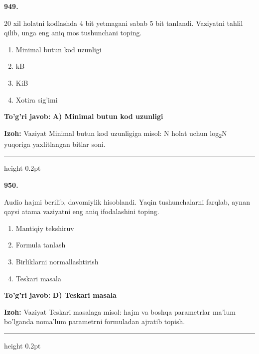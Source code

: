 \documentclass[10pt,a4paper,oneside]{article}
\begin{document}
\noindent\textbf{\color{ink}949.}
\par
20 xil holatni kodlashda 4 bit yetmagani sabab 5 bit tanlandi. Vaziyatni tahlil qilib, unga eng aniq mos tushunchani toping.
\begin{enumerate}[label=\Alph*),leftmargin=9mm]
\item Minimal butun kod uzunligi
\item kB
\item KiB
\item Xotira sig'imi
\end{enumerate}
\begin{tcolorbox}[enhanced,breakable,colback=teal!4,colframe=teal!50!black,boxrule=0.5pt,arc=1.1mm,left=3mm,right=3mm,top=1.7mm,bottom=1.7mm,before skip=2mm,after skip=2mm]
\textbf{\color{teal}To'g'ri javob:} \textbf{A) Minimal butun kod uzunligi}
\par\smallskip
\textbf{Izoh:} Vaziyat Minimal butun kod uzunligiga misol: N holat uchun log\textsubscript{2}N yuqoriga yaxlitlangan bitlar soni.
\end{tcolorbox}
\vspace{2mm}\hrule height 0.2pt \vspace{3mm}

\noindent\textbf{\color{ink}950.}
\par
Audio hajmi berilib, davomiylik hisoblandi. Yaqin tushunchalarni farqlab, aynan qaysi atama vaziyatni eng aniq ifodalashini toping.
\begin{enumerate}[label=\Alph*),leftmargin=9mm]
\item Mantiqiy tekshiruv
\item Formula tanlash
\item Birliklarni normallashtirish
\item Teskari masala
\end{enumerate}
\begin{tcolorbox}[enhanced,breakable,colback=teal!4,colframe=teal!50!black,boxrule=0.5pt,arc=1.1mm,left=3mm,right=3mm,top=1.7mm,bottom=1.7mm,before skip=2mm,after skip=2mm]
\textbf{\color{teal}To'g'ri javob:} \textbf{D) Teskari masala}
\par\smallskip
\textbf{Izoh:} Vaziyat Teskari masalaga misol: hajm va boshqa parametrlar ma'lum bo'lganda noma'lum parametrni formuladan ajratib topish.
\end{tcolorbox}
\vspace{2mm}\hrule height 0.2pt \vspace{3mm}
\end{document}
